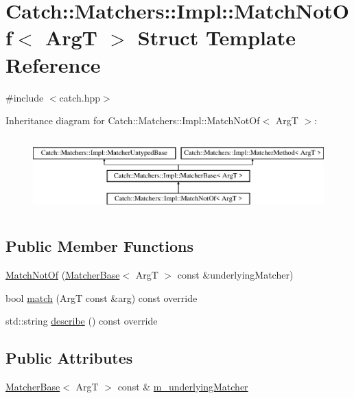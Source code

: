 \hypertarget{struct_catch_1_1_matchers_1_1_impl_1_1_match_not_of}{}\section{Catch\+:\+:Matchers\+:\+:Impl\+:\+:Match\+Not\+Of$<$ ArgT $>$ Struct Template Reference}
\label{struct_catch_1_1_matchers_1_1_impl_1_1_match_not_of}


{\ttfamily \#include $<$catch.\+hpp$>$}

Inheritance diagram for Catch\+:\+:Matchers\+:\+:Impl\+:\+:Match\+Not\+Of$<$ ArgT $>$\+:\begin{figure}[H]
\begin{center}
\leavevmode
\includegraphics[height=2.926829cm]{struct_catch_1_1_matchers_1_1_impl_1_1_match_not_of}
\end{center}
\end{figure}
\subsection*{Public Member Functions}
\begin{DoxyCompactItemize}
\item 
\mbox{\hyperlink{struct_catch_1_1_matchers_1_1_impl_1_1_match_not_of_a47afdd9e4c3354cef85adc3186097ae4}{Match\+Not\+Of}} (\mbox{\hyperlink{struct_catch_1_1_matchers_1_1_impl_1_1_matcher_base}{Matcher\+Base}}$<$ ArgT $>$ const \&underlying\+Matcher)
\item 
bool \mbox{\hyperlink{struct_catch_1_1_matchers_1_1_impl_1_1_match_not_of_a181d693c0258e582d80dc6117a1f2b66}{match}} (ArgT const \&arg) const override
\item 
std\+::string \mbox{\hyperlink{struct_catch_1_1_matchers_1_1_impl_1_1_match_not_of_ac5fb4ef6a9069d23a4098c3c818f06b0}{describe}} () const override
\end{DoxyCompactItemize}
\subsection*{Public Attributes}
\begin{DoxyCompactItemize}
\item 
\mbox{\hyperlink{struct_catch_1_1_matchers_1_1_impl_1_1_matcher_base}{Matcher\+Base}}$<$ ArgT $>$ const  \& \mbox{\hyperlink{struct_catch_1_1_matchers_1_1_impl_1_1_match_not_of_af7ac67f112b0e93796b048a47329aad4}{m\+\_\+underlying\+Matcher}}
\end{DoxyCompactItemize}
